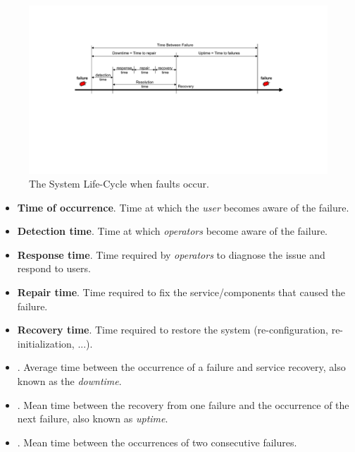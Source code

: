 \begin{figure}[!htp]
    \centering
    \includegraphics[width=\textwidth]{img/system-life-cycle-1.pdf}
    \caption{The System Life-Cycle when faults occur.}
    \label{fig: The System Life-Cycle when faults occur}
\end{figure}
\begin{itemize}
    \item \textbf{Time of occurrence}. Time at which the \emph{user} becomes aware of the failure.
    
    \item \textbf{Detection time}. Time at which \emph{operators} become aware of the failure.
    
    \item \textbf{Response time}. Time required by \emph{operators} to diagnose the issue and respond to users.
    
    \item \textbf{Repair time}. Time required to fix the service/components that caused the failure.
    
    \item \textbf{Recovery time}. Time required to restore the system (re-configuration, re-initialization, ...).
    
    \item {}. Average time between the occurrence of a failure and service recovery, also known as the \emph{downtime}.

    \item {}. Mean time between the recovery from one failure and the occurrence of the next failure, also known as \emph{uptime}.

    \item {}. Mean time between the occurrences of two consecutive failures.
\end{itemize}


